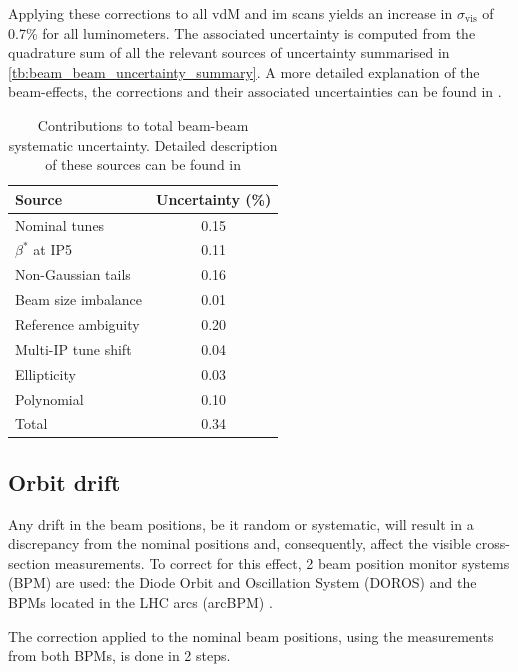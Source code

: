 Applying these corrections to all vdM and im scans yields an increase in $\sigma_{\mathrm{vis}}$ of 0.7\% for all luminometers. The associated uncertainty is computed from the quadrature sum of all the relevant sources of uncertainty summarised in \autoref{tb:beam_beam_uncertainty_summary}. A more detailed explanation of the beam-effects, the corrections and their associated uncertainties can be found in \cite{babaev2021coherentdeflectionellipticbunches}.

\begin{table}
	\centering
	\caption{Contributions to total beam-beam systematic uncertainty. Detailed description of these sources can be found in \cite{babaev2021coherentdeflectionellipticbunches}}\label{tab:bb:1}
	\label{tb:beam_beam_uncertainty_summary}
	\begin{tabular}{l|c}
		\hline
		Source & Uncertainty (\%) \\
		\hline
		Nominal tunes & 0.15 \\
		$\beta^{*}$ at IP5 & 0.11 \\
		Non-Gaussian tails & 0.16 \\
		Beam size imbalance & 0.01 \\
		Reference ambiguity & 0.20 \\
		Multi-IP tune shift & 0.04 \\
		Ellipticity & 0.03 \\
		Polynomial & 0.10 \\
		\hline
		Total & 0.34 \\
		\hline
	\end{tabular}
\end{table}

\subsection{Orbit drift}

Any drift in the beam positions, be it random or systematic, will result in a discrepancy from the nominal positions and, consequently, affect the visible cross-section measurements. To correct for this effect, 2 beam position monitor systems (BPM) are used: the Diode Orbit and Oscillation System (DOROS) \cite{Gąsior:2313935} and the BPMs located in the LHC arcs (arcBPM) \cite{Sirunyan:2759951}.

The correction applied to the nominal beam positions, using the measurements from both BPMs, is done in 2 steps.

